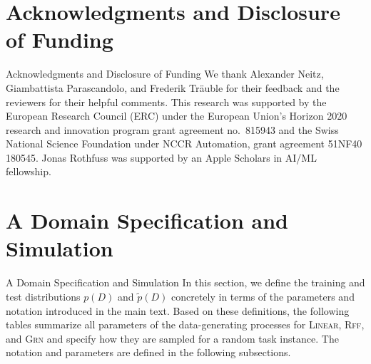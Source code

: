 \documentclass[aspectratio=169,10pt]{beamer}
\newcommand{\domain}[1]{\textsc{#1}}
\newcommand{\lineardomain}{\domain{Linear}\xspace}
\newcommand{\rffdomain}{\domain{Rff}\xspace}
\newcommand{\grndomain}{\domain{Grn}\xspace}
\begin{document}
\section*{Acknowledgments and Disclosure of Funding}

\begin{frame}{Acknowledgments and Disclosure of Funding}
We thank Alexander Neitz, Giambattista Parascandolo, and Frederik Tr\"auble for their feedback and the reviewers for their helpful comments. This research was supported by the European Research Council (ERC) under the European Union's Horizon 2020 research and innovation program grant agreement no.\ 815943 and the Swiss National Science Foundation under NCCR Automation, grant agreement 51NF40 180545. Jonas Rothfuss was supported by an Apple Scholars in AI/ML fellowship.
\end{frame}

\appendix
\section{A Domain Specification and Simulation}

\begin{frame}{A Domain Specification and Simulation}
In this section, we define the training and test distributions $p(D)$ and $\tilde{p}(D)$ concretely in terms of the parameters and notation introduced in the main text. Based on these definitions, the following tables summarize all parameters of the data-generating processes for \lineardomain, \rffdomain, and \grndomain and specify how they are sampled for a random task instance. The notation and parameters are defined in the following subsections.
\end{frame}
\end{document}
